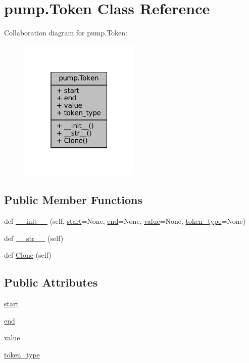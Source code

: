 \hypertarget{classpump_1_1Token}{}\section{pump.\+Token Class Reference}
\label{classpump_1_1Token}


Collaboration diagram for pump.\+Token\+:
\nopagebreak
\begin{figure}[H]
\begin{center}
\leavevmode
\includegraphics[width=163pt]{classpump_1_1Token__coll__graph}
\end{center}
\end{figure}
\subsection*{Public Member Functions}
\begin{DoxyCompactItemize}
\item 
def \hyperlink{classpump_1_1Token_a55e6843fd724dc3771861372d5116f48}{\+\_\+\+\_\+init\+\_\+\+\_\+} (self, \hyperlink{classpump_1_1Token_a53e3333a770bc8773224a5af78bca5bb}{start}=None, \hyperlink{classpump_1_1Token_abb88c0ece4274cfd974fd01d0468953c}{end}=None, \hyperlink{classpump_1_1Token_a5b7ab395a380b775b2bf0a8b0abfda86}{value}=None, \hyperlink{classpump_1_1Token_aeac105b76f6af13c8c64ba0a94e37d90}{token\+\_\+type}=None)
\item 
def \hyperlink{classpump_1_1Token_ad0079ae4449d89bc2d5756488099cb33}{\+\_\+\+\_\+str\+\_\+\+\_\+} (self)
\item 
def \hyperlink{classpump_1_1Token_abc0f2d2a0bcad953f5fc85a4e52076eb}{Clone} (self)
\end{DoxyCompactItemize}
\subsection*{Public Attributes}
\begin{DoxyCompactItemize}
\item 
\hyperlink{classpump_1_1Token_a53e3333a770bc8773224a5af78bca5bb}{start}
\item 
\hyperlink{classpump_1_1Token_abb88c0ece4274cfd974fd01d0468953c}{end}
\item 
\hyperlink{classpump_1_1Token_a5b7ab395a380b775b2bf0a8b0abfda86}{value}
\item 
\hyperlink{classpump_1_1Token_aeac105b76f6af13c8c64ba0a94e37d90}{token\+\_\+type}
\end{DoxyCompactItemize}


